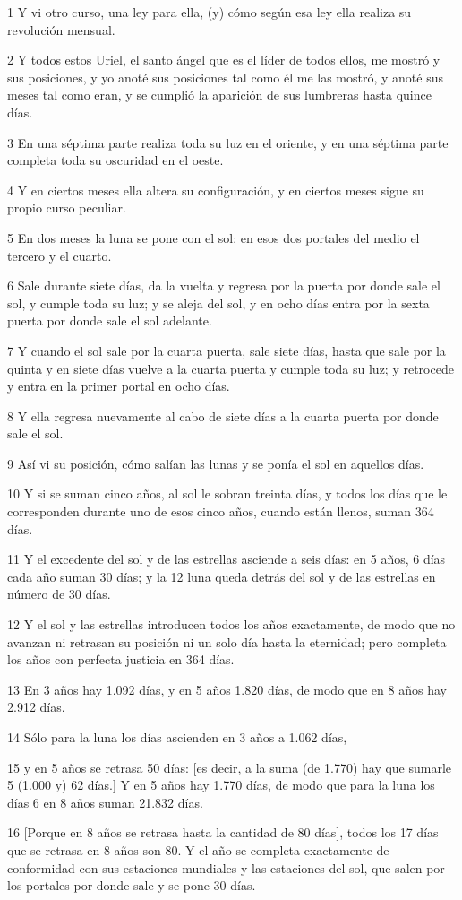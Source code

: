 \par 1 Y vi otro curso, una ley para ella, (y) cómo según esa ley ella realiza su revolución mensual.
\par 2 Y todos estos Uriel, el santo ángel que es el líder de todos ellos, me mostró y sus posiciones, y yo anoté sus posiciones tal como él me las mostró, y anoté sus meses tal como eran, y se cumplió la aparición de sus lumbreras hasta quince días.
\par 3 En una séptima parte realiza toda su luz en el oriente, y en una séptima parte completa toda su oscuridad en el oeste.
\par 4 Y en ciertos meses ella altera su configuración, y en ciertos meses sigue su propio curso peculiar.
\par 5 En dos meses la luna se pone con el sol: en esos dos portales del medio el tercero y el cuarto.
\par 6 Sale durante siete días, da la vuelta y regresa por la puerta por donde sale el sol, y cumple toda su luz; y se aleja del sol, y en ocho días entra por la sexta puerta por donde sale el sol adelante.
\par 7 Y cuando el sol sale por la cuarta puerta, sale siete días, hasta que sale por la quinta y en siete días vuelve a la cuarta puerta y cumple toda su luz; y retrocede y entra en la primer portal en ocho días.
\par 8 Y ella regresa nuevamente al cabo de siete días a la cuarta puerta por donde sale el sol.
\par 9 Así vi su posición, cómo salían las lunas y se ponía el sol en aquellos días.
\par 10 Y si se suman cinco años, al sol le sobran treinta días, y todos los días que le corresponden durante uno de esos cinco años, cuando están llenos, suman 364 días.
\par 11 Y el excedente del sol y de las estrellas asciende a seis días: en 5 años, 6 días cada año suman 30 días; y la 12 luna queda detrás del sol y de las estrellas en número de 30 días.
\par 12 Y el sol y las estrellas introducen todos los años exactamente, de modo que no avanzan ni retrasan su posición ni un solo día hasta la eternidad; pero completa los años con perfecta justicia en 364 días.
\par 13 En 3 años hay 1.092 días, y en 5 años 1.820 días, de modo que en 8 años hay 2.912 días.
\par 14 Sólo para la luna los días ascienden en 3 años a 1.062 días,
\par 15 y en 5 años se retrasa 50 días: [es decir, a la suma (de 1.770) hay que sumarle 5 (1.000 y) 62 días.] Y en 5 años hay 1.770 días, de modo que para la luna los días 6 en 8 años suman 21.832 días.
\par 16 [Porque en 8 años se retrasa hasta la cantidad de 80 días], todos los 17 días que se retrasa en 8 años son 80. Y el año se completa exactamente de conformidad con sus estaciones mundiales y las estaciones del sol, que salen por los portales por donde sale y se pone 30 días.

